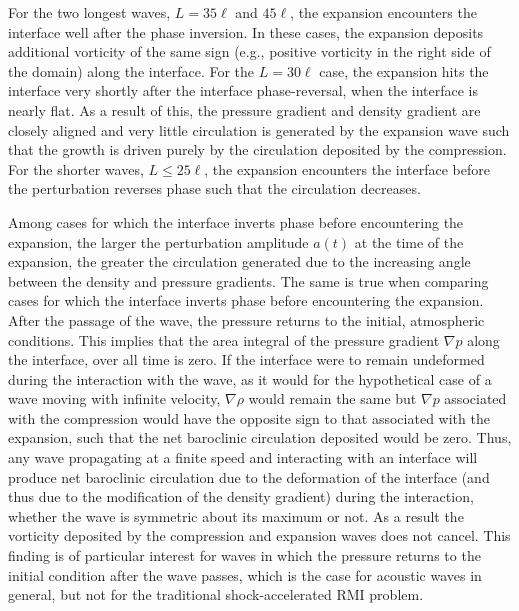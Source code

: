 \documentclass{jfm}%
\begin{document}
For the two longest waves, $L=35\ell$ and $45\ell$, the expansion
encounters the interface well after the phase inversion. In these
cases, the expansion deposits additional vorticity of the same sign
(e.g., positive vorticity in the right side of the domain) along the
interface. For the $L=30\ell$ case, the expansion hits the interface
very shortly after the interface phase-reversal, when the interface is
nearly flat. As a result of this, the pressure gradient and density
gradient are closely aligned and very little circulation is generated
by the expansion wave such that the growth is driven purely by the
circulation deposited by the compression. For the shorter waves,
$L \leq 25\ell$, the expansion encounters the interface before the
perturbation reverses phase such that the circulation decreases.

Among cases for which the interface inverts phase before encountering
the expansion, the larger the perturbation amplitude $a(t)$ at the
time of the expansion, the greater the circulation generated due to
the increasing angle between the density and pressure gradients. The
same is true when comparing cases for which the interface inverts
phase before encountering the expansion. After the passage of the
wave, the pressure returns to the initial, atmospheric
conditions. This implies that the area integral of the pressure
gradient $\nabla p$ along the interface, over all time is zero. If the
interface were to remain undeformed during the interaction with the
wave, as it would for the hypothetical case of a wave moving with
infinite velocity, $\nabla \rho$ would remain the same but $\nabla p$
associated with the compression would have the opposite sign to that
associated with the expansion, such that the net baroclinic
circulation deposited would be zero. Thus, any wave propagating at a
finite speed and interacting with an interface will produce net
baroclinic circulation due to the deformation of the interface (and
thus due to the modification of the density gradient) during the
interaction, whether the wave is symmetric about its maximum or
not. As a result the vorticity deposited by the compression and
expansion waves does not cancel. This finding is of particular
interest for waves in which the pressure returns to the initial
condition after the wave passes, which is the case for acoustic waves
in general, but not for the traditional shock-accelerated \ac{RMI}
problem.
%
\end{document}
